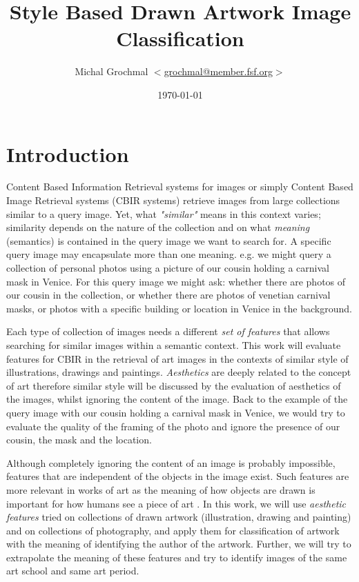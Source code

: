 \documentclass[a4paper,twocolumn]{article}
\title{Style Based Drawn Artwork Image Classification}
\author{Michal Grochmal
  $<$\href{mailto:grochmal@member.fsf.org}{grochmal@member.fsf.org}$>$
}
\date{\today}
\begin{document}
\maketitle

\section{Introduction}

Content Based Information Retrieval systems for images or simply Content Based
Image Retrieval systems (CBIR systems) retrieve images from large collections
similar to a query image.  Yet, what \emph{"similar"} means in this context
varies;  similarity depends on the nature of the collection and on what
\emph{meaning} (semantics) is contained in the query image we want to search
for.  A specific query image may encapsulate more than one meaning.  e.g. we
might query a collection of personal photos using a picture of our cousin
holding a carnival mask in Venice.  For this query image we might ask: whether
there are photos of our cousin in the collection, or whether there are photos
of venetian carnival masks, or photos with a specific building or location in
Venice in the background.

Each type of collection of images needs a different \emph{set of features} that
allows searching for similar images within a semantic context.  This work will
evaluate features for CBIR in the retrieval of art images in the contexts of
similar style of illustrations, drawings and paintings.  \emph{Aesthetics} are
deeply related to the concept of art \cite{rmc12ajs} therefore similar style
will be discussed by the evaluation of aesthetics of the images, whilst
ignoring the content of the image.  Back to the example of the query image with
our cousin holding a carnival mask in Venice, we would try to evaluate the
quality of the framing of the photo and ignore the presence of our cousin, the
mask and the location.

Although completely ignoring the content of an image is probably impossible,
features that are independent of the objects in the image exist.  Such features
are more relevant in works of art \cite{zirnhelt07art} as the meaning of how
objects are drawn is important for how humans see a piece of art
\cite{mach10clas}.  In this work, we will use \emph{aesthetic features} tried
on collections of drawn artwork (illustration, drawing and painting) and on
collections of photography, and apply them for classification of artwork with
the meaning of identifying the author of the artwork.  Further, we will try to
extrapolate the meaning of these features and try to identify images of the
same art school and same art period.
\end{document}
